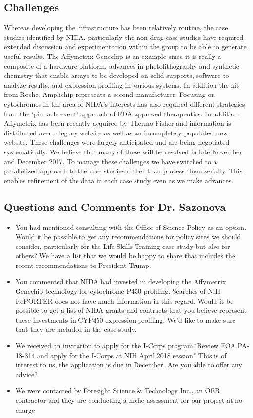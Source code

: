 \documentclass[11pt, oneside]{article}   	%
\begin{document}
\subsection*{Challenges} Whereas developing the infrastructure has been relatively routine, the case studies identified by NIDA, particularly the non-drug case studies have required extended discussion and experimentation within the group to be able to generate useful results. The Affymetrix Genechip is an example since it is really a composite of a hardware platform, advances in photolithography and synthetic chemistry that enable arrays to be developed on solid supports, software to analyze results, and expression profiling in various systems. In addition the kit from Roche, Amplichip represents a second manufacturer. Focusing on cytochromes in the area of NIDA's interests has also required different strategies from the `pinnacle event' approach of FDA approved therapeutics. In addition, Affymetrix has been recently acquired by Thermo-Fisher and information is distributed over a legacy website as well as an incompletely populated new website. These challenges were largely anticipated and are being negotiated systematically. We believe that many of these will be resolved in late November and December 2017. To manage these challenges we have switched to a parallelized approach to the case studies rather than process them serially. This enables refinement of the data in each case study even as we make advances.

\subsection*{Questions and Comments for Dr. Sazonova}

\begin{itemize}
 \item You had mentioned consulting with the Office of Science Policy as an option. Would it be possible to get any recommendations for policy sites we should consider, particularly for the Life Skills Training case study but also for others? We have a list that we would be happy to share that includes the recent recommendations to President Trump.
 \item You commented that NIDA had invested in developing the Affymetrix Genechip technology for cytochrome P450 profiling. Searches of NIH RePORTER does not have much information in this regard. Would it be possible to get a list of NIDA grants and contracts that you believe represent these investments in CYP450 expression profiling. We'd like to make sure that they are included in the case study.
 \item We received an invitation to apply for the I-Corps program.``Review FOA PA-18-314 and apply for the I-Corps at NIH April 2018 session'' This is of interest to us, the application is due in December. Are you able to offer any advice?
 \item We were contacted by Foresight Science \& Technology Inc., an OER contractor and they are conducting a niche assessment for our project at no charge
 \end {itemize}
\end{document}
